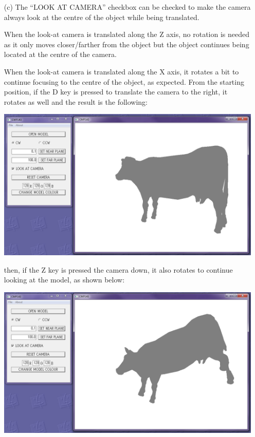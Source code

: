 \documentclass[12pt]{article}
\begin{document}
\begin{itemize}
\item[(c)] The ``LOOK AT CAMERA'' checkbox can be checked to make the camera always look at the centre of the object while being translated.

When the look-at camera is translated along the Z axis, no rotation is needed as it only moves closer/farther from the object but the object continues being located at the centre of the camera.

When the look-at camera is translated along the X axis, it rotates a bit to continue focusing to the centre of the object, as expected. From the starting position, if the D key is pressed to translate the camera to the right, it rotates as well and the result is the following:
\begin{center}
	\includegraphics[scale=0.5]{7.png}
\end{center}
then, if the Z key is pressed the camera down, it also rotates to continue looking at the model, as shown below:
\begin{center}
	\includegraphics[scale=0.5]{8.png}
\end{center}


\end{itemize}
\end{document}
